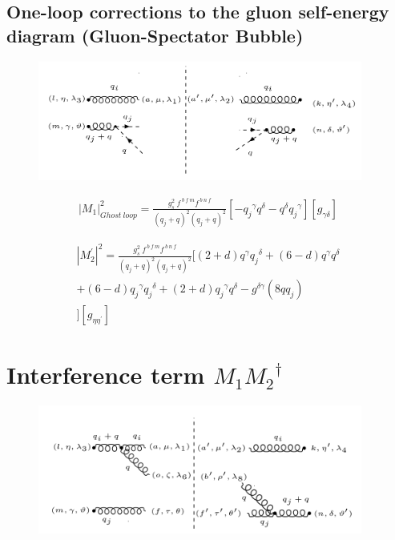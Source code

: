 \subsection{One-loop corrections to the gluon self-energy diagram (Gluon-Spectator Bubble)}
\begin{figure}[h!]
\centering
\includegraphics[width=0.95\textwidth]{images/GG/GhostM2.png}
\end{figure}
\begin{equation}
\begin{split}
{{|M_1|}^2_{Ghost \:loop}}=\frac{g_s^2 \:f^{\:b\:f\:m} f^{\:b\:n\:f}}{(q_j +q)^2 (q_j +q)^2} [-{q_j}^{{\gamma}}{q}^{{\delta}}-{q}^{{\delta}}{q_j}^{{\gamma}}][g_{{\gamma}{\delta}}]
\end{split}
\end{equation}

\begin{equation}
\begin{split}
{|{M}^{\prime}_2|}^2 =\frac{g_s^2\: f^{\:b\:f\:m} f^{\:b\:n\:f}}{(q_j +q)^2 (q_j +q)^2}[(2+d)q^{\gamma}{q_j}^{\delta}+(6-d)q^{\gamma}{q}^{\delta}\\+(6-d){q_j}^{\gamma}{q_j}^{\delta}+(2+d){q_j}^{\gamma}{q}^{\delta}-g^{{\delta}{\gamma}}(8qq_j)\\
][g_{{\eta}{{\eta}^{\prime}}}]
\end{split}
\end{equation}

\section{Interference term $M_1 {M_2}^{\dagger}$}
\begin{figure}[h!]
\centering
\includegraphics[width=0.95\textwidth]{images/GG/M1M2Dagger.png}
\end{figure}

